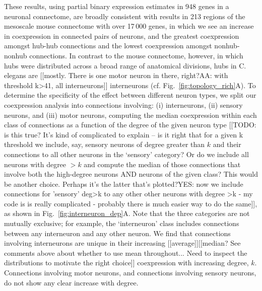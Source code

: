 \documentclass[10pt,letterpaper]{article}
\begin{document}
These results, using partial binary expression estimates in 948 genes in a neuronal connectome, are broadly consistent with results in 213 regions of the mesoscale mouse connectome with over 17\,000 genes, in which we see an increase in coexpression in connected pairs of neurons, and the greatest coexpression amongst hub-hub connections and the lowest coexpression amongst nonhub-nonhub connections.
In contrast to the mouse connectome, however, in which hubs were distributed across a broad range of anatomical divisions, hubs in C. elegans are [[mostly. There is one motor neuron in there, right?AA: with threshold k>41, all interneurons]] interneurons \cite{Towlson:2013gf} (cf. Fig.~\ref{fig:topology_rich}A).
To determine the specificity of the effect between different neuron types, we split our coexpression analysis into connections involving: (i) interneurons, (ii) sensory neurons, and (iii) motor neurons, computing the median coexpression within each class of connections as a function of the degree of the given neuron type [[TODO: is this true? It's kind of complicated to explain -- is it right that for a given k threshold we include, say, sensory neurons of degree greater than $k$ and their connections to all other neurons in the `sensory' category? Or do we include all neurons with degree $>k$ and compute the median of those connections that involve both the high-degree neurons AND neurons of the given class? This would be another choice. Perhaps it's the latter that's plotted?YES: now we include connections for 'sensory' deg>k to any other other neurons with degree >k - my code is is really complicated - probably there is much easier way to do the same]], as shown in Fig.~\ref{fig:interneuron_dep}A.
Note that the three categories are not mutually exclusive; for example, the `interneuron' class includes connections between any interneuron and any other neuron.
We find that connections involving interneurons are unique in their increasing [[average]][[median? See comments above about whether to use mean throughout... Need to inspect the distributions to motivate the right choice]] coexpression with increasing degree, $k$.
Connections involving motor neurons, and connections involving sensory neurons, do not show any clear increase with degree.
\end{document}
